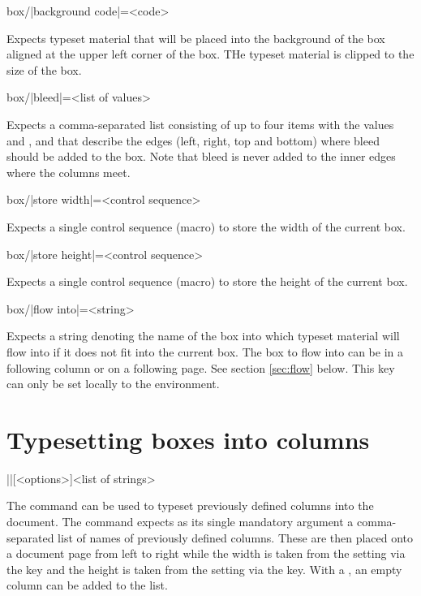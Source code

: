 \documentclass[a4paper]{article}
\begin{document}
\begin{macrodef}
box/|background code|={<code>}
\end{macrodef}
Expects typeset material that will be placed into the background of the box aligned at the upper left corner of the box. THe typeset material is clipped to the size of the box.

\begin{macrodef}
box/|bleed|={<list of values>}
\end{macrodef}
Expects a comma-separated list consisting of up to four items with the values  and ,  and  that describe the edges (left, right, top and bottom) where bleed should be added to the box. Note that bleed is never added to the inner edges where the columns meet.

\begin{macrodef}
box/|store width|={<control sequence>}
\end{macrodef}
Expects a single control sequence (macro) to store the width of the current box.

\begin{macrodef}
box/|store height|={<control sequence>}
\end{macrodef}
Expects a single control sequence (macro) to store the height of the current box.

\begin{macrodef}
box/|flow into|={<string>}
\end{macrodef}
Expects a string denoting the name of the box into which typeset material will flow into if it does not fit into the current box. The box to flow into can be in a following column or on a following page. See section \ref{sec:flow} below. This key can only be set locally to the  environment.

\section{Typesetting boxes into columns}

\begin{macrodef}
|\leporellotypesetcolumns|[<options>]{<list of strings>}
\end{macrodef}
The command \macro{\leporellotypesetcolumns} can be used to typeset previously defined columns into the document. The command expects as its single mandatory argument a comma-separated list of names of previously defined columns. These are then placed onto a document page from left to right while the width is taken from the setting via the  key and the height is taken from the setting via the  key. With a , an empty column can be added to the list.
\end{document}
